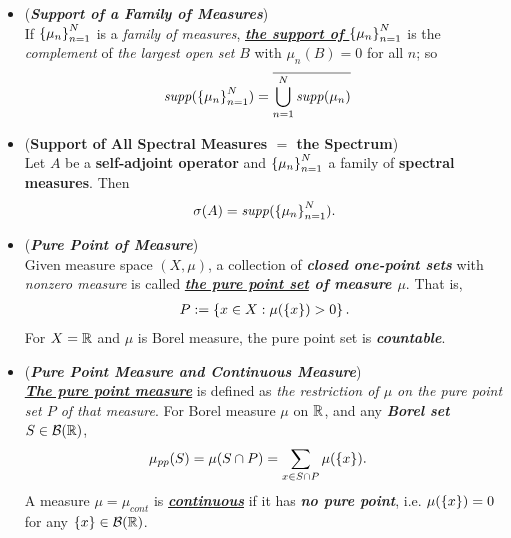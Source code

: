 \documentclass[11pt]{article}
\begin{document}
\begin{itemize} 
\item \begin{definition} (\emph{\textbf{Support of a Family of Measures}})\\
If $\left\{\mu_n\right\}_{n=1}^{N}$ is a \emph{family of measures}, \underline{\emph{\textbf{the support of $\left\{\mu_n\right\}_{n=1}^{N}$}}} is the 
\emph{complement} of \emph{the largest open set} $Β$ with $\mu_n(B) = 0$ for all $n$; so 
\begin{align*}
\text{\emph{supp}}(\left\{\mu_n\right\}_{n=1}^{N}) &= \overline{\bigcup_{n=1}^{N}\text{\emph{supp}}(\mu_n)}
\end{align*}
\end{definition}

\item \begin{proposition} (\textbf{Support of All Spectral Measures $=$ the Spectrum}) \citep{reed1980methods}\\
Let $A$ be a \textbf{self-adjoint operator} and $\left\{\mu_n\right\}_{n=1}^{N}$ a family of \textbf{spectral measures}. Then 
\begin{align*}
\sigma(A) = \text{\emph{supp}}(\left\{\mu_n\right\}_{n=1}^{N}).
\end{align*}
\end{proposition}


\item \begin{definition} (\emph{\textbf{Pure Point of Measure}})\\
Given measure space $(X, \mu)$, a collection of \emph{\textbf{closed one-point sets}} with \emph{nonzero measure} is called \emph{\textbf{\underline{the pure point set} of measure $\mu$}}. That is,
\begin{align*}
P := \left\{x \in X:  \mu(\left\{x\right\}) >0 \right\}.
\end{align*} For $X = {\mathbb R}$ and $\mu$ is Borel measure, the pure point set is \emph{\textbf{countable}}.
\end{definition}

\item \begin{definition} (\emph{\textbf{Pure Point Measure and Continuous Measure}})\\
\emph{\textbf{\underline{The pure point measure}}} is defined as \emph{the restriction of $\mu$ on the pure point set $P$ of that measure}. For Borel measure $\mu$ on ${\mathbb R}$, and any \emph{\textbf{Borel set}} $S \in {\mathcal B}({\mathbb R})$, 
\begin{align*}
\mu_{pp}(S) &= \mu(S \cap P) = \sum_{x \in S\cap P}\mu(\left\{x\right\}).
\end{align*} A measure $\mu = \mu_{cont}$ is \emph{\textbf{\underline{continuous}}} if it has \emph{\textbf{no pure point}}, i.e. $\mu(\left\{x\right\}) = 0$ for any $\left\{x\right\} \in {\mathcal B}({\mathbb R})$.


\end{definition}
\end{itemize}
\end{document}
